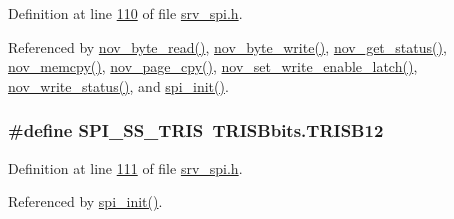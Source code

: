 Definition at line \hyperlink{a00011_source_l00110}{110} of file \hyperlink{a00011_source}{srv\+\_\+spi.\+h}.



Referenced by \hyperlink{a00058_source_l00633}{nov\+\_\+byte\+\_\+read()}, \hyperlink{a00058_source_l00608}{nov\+\_\+byte\+\_\+write()}, \hyperlink{a00058_source_l00567}{nov\+\_\+get\+\_\+status()}, \hyperlink{a00058_source_l00723}{nov\+\_\+memcpy()}, \hyperlink{a00058_source_l00663}{nov\+\_\+page\+\_\+cpy()}, \hyperlink{a00058_source_l00553}{nov\+\_\+set\+\_\+write\+\_\+enable\+\_\+latch()}, \hyperlink{a00058_source_l00586}{nov\+\_\+write\+\_\+status()}, and \hyperlink{a00030_source_l00030}{spi\+\_\+init()}.

\hypertarget{a00011_a1424f86a2482cfbcf68f709ce542e262}{
\subsubsection[{S\+P\+I\+\_\+\+S\+S\+\_\+\+T\+R\+I\+S}]{\setlength{\rightskip}{0pt plus 5cm}\#define S\+P\+I\+\_\+\+S\+S\+\_\+\+T\+R\+I\+S~T\+R\+I\+S\+Bbits.\+T\+R\+I\+S\+B12}}\label{a00011_a1424f86a2482cfbcf68f709ce542e262}


Definition at line \hyperlink{a00011_source_l00111}{111} of file \hyperlink{a00011_source}{srv\+\_\+spi.\+h}.



Referenced by \hyperlink{a00030_source_l00030}{spi\+\_\+init()}.



